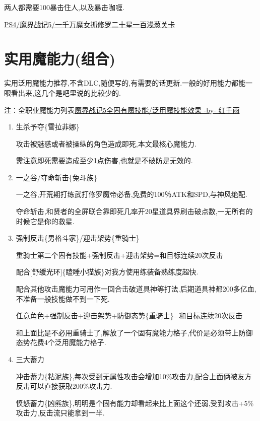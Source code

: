 		两人都需要100暴击住人,以及暴击咖喱.

		\href{http://www.bilibili.com/video/av3405842/}{PS4/魔界战记5/一千万魔女抓修罗二十星一百浅葱关卡}

	\newpage

	\section{实用魔能力(组合)}

	实用泛用魔能力推荐,不含DLC,随便写的,有需要的话更新.一般的好用能力都能一眼看出来,这几个是吧里说的比较少的.

	注：全职业魔能力列表\href{http://tieba.baidu.com/p/3765501530}{魔界战记5全固有魔技能/泛用魔技能效果 -by- 红千雨}

	\begin{enumerate}

		\item
		生杀予夺\{雪拉菲娜\}

		攻击被魅惑或者被操纵的角色造成即死,本文最核心魔能力.

		需注意即死需要造成至少1点伤害,也就是不破防是无效的.

		\item
		一之谷/夺命斩击\{兔斗族\}

		一之谷,开荒期打练武打修罗魔帝必备,免费的100％ATK和SPD,与神风绝配.

		夺命斩击,和贤者的全屏联合靠即死几率开20星道具界刷击破点数,一无所有的时候它是你的救星.

		\item
		强制反击\{男格斗家\}/迎击架势\{重骑士\}

		重骑士第二个固有技能+强制反击+迎击架势=和目标连续20次反击

		配合[舒缓光环]\{瞌睡小猫族\}对我方使用练装备熟练度超快.

		配合其他攻击魔能力可用作一回合击破道具神等打法.后期道具神都200多亿血,不准备一般技能做不到一下死.

		任意角色+强制反击+迎击架势+防御态势\{重骑士\}=和目标连续20次反击

		和上面比是不必用重骑士了,解放了一个固有魔能力格子,代价是必须带上防御态势花费4个泛用魔能力格子.

		\item
		三大蓄力

		冲击蓄力\{粘泥族\},每次受到无属性攻击会增加10\%攻击力,配合上面俩被友方反击可以直接获取200\%攻击力.

		愤怒蓄力\{凶熊族\},明明是个固有能力却看起来比上面这个还弱,受到攻击+5\%攻击力,反击流只能拿到一半.


\end{enumerate}
